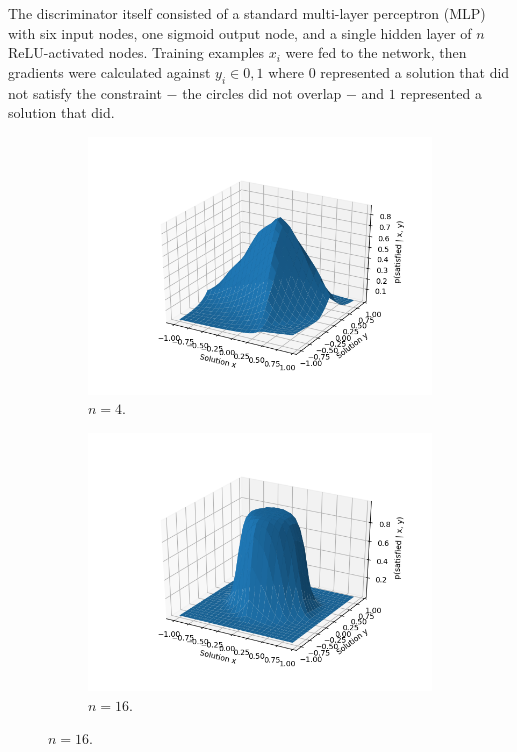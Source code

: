 \documentclass[a4paper]{article}
\begin{document}
The discriminator itself consisted of a standard multi-layer perceptron (MLP) with six input nodes, one sigmoid output node, and a single hidden layer of $n$ ReLU-activated nodes.
Training examples $x_i$ were fed to the network, then gradients were calculated against $y_i \in 0, 1$ where $0$ represented a solution
that did not satisfy the constraint $-$ the circles did not overlap $-$ and $1$ represented a solution that did.

\begin{figure}
\centering
  \begin{subfigure}[a]{.8\linewidth}
    \includegraphics[width=.8\linewidth]{../../figures/artificial-discriminator-predicted-objective-function-4-hidden-nodes.png}
    \caption{$n = 4$.}
  \end{subfigure}
  \begin{subfigure}[a]{.8\linewidth}
    \includegraphics[width=.8\linewidth]{../../figures/artificial-discriminator-predicted-objective-function-16-hidden-nodes.png}
    \caption{$n = 16$.}
  \end{subfigure}

\end{figure}
\end{document}
